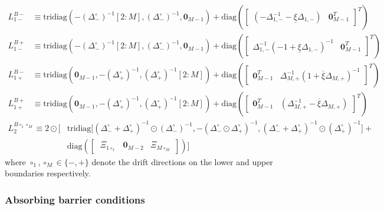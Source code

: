 \documentclass[11pt]{article}
\newcommand{\tridiag}{\ensuremath{\mathrm{tridiag}}}
\newcommand{\diag}{\ensuremath{\mathrm{diag}}}
\theoremstyle{definition}
\begin{document}
\begin{align}
{L}_{1-}^{B-} &\equiv
\tridiag \left(-(\Delta_-^\circ)^{-1}[2:M], (\Delta_-^\circ )^{-1}, \mathbf{0}_{M-1}  \right) +
\diag\left( 
\begin{bmatrix}
(-\Delta^{-1}_{1,-} - \underline{\xi} \Delta_{1,-}) &
\mathbf{0}_{M-1}^T
\end{bmatrix}^T
\right) \\
{L}_{1-}^{B+} &\equiv
\tridiag \left(-(\Delta_-^\circ)^{-1}[2:M], (\Delta_-^\circ )^{-1}, \mathbf{0}_{M-1}  \right) +
\diag\left( 
\begin{bmatrix}
\Delta^{-1}_{1,-} (-1 + \underline{\xi} \Delta_{1,-})^{-1} &
\mathbf{0}_{M-1}^T
\end{bmatrix}^T
\right)
\end{align}
\begin{align}
{L}_{1+}^{B-} &\equiv
\tridiag \left(\mathbf{0}_{M-1}, -(\Delta_+^\circ )^{-1}, (\Delta_+^\circ)^{-1}[2:M]  \right) +
\diag\left( 
\begin{bmatrix}
\mathbf{0}_{M-1}^T &
\Delta^{-1}_{M,+} (1 + \overline{\xi} \Delta_{M,+})^{-1}
\end{bmatrix}^T
\right) \\
{L}_{1+}^{B+} &\equiv
\tridiag \left(\mathbf{0}_{M-1}, -(\Delta_+^\circ )^{-1}, (\Delta_+^\circ)^{-1}[2:M]  \right) +
\diag\left( 
\begin{bmatrix}
\mathbf{0}_{M-1}^T &
(\Delta^{-1}_{M,+} - \overline{\xi} \Delta_{M,+})
\end{bmatrix}^T
\right) 
\end{align}
\begin{align}
{L}_{2}^{B \circ_1 \circ_M } \equiv
2 \odot \Big[ & \text{tridiag} \Big[(\Delta_-^\circ + \Delta_+^\circ)^{-1} \odot (\Delta_{-}^\circ)^{-1}, 
-(\Delta_-^\circ \odot \Delta_+^\circ)^{-1},
(\Delta_-^\circ + \Delta_+^\circ)^{-1} \odot (\Delta_{+}^\circ)^{-1} \Big] + \\ & \diag\left(  
\begin{bmatrix} \
\Xi_{1 \circ_1} & \mathbf{0}_{M-2} & \Xi_{M \circ_M}
\end{bmatrix}
\right) \Big]
\end{align}
where $\circ_1, \circ_M \in \{-, +\}$ denote the drift directions on the lower and upper boundaries respectively.


\subsubsection{Absorbing barrier conditions}
\end{document}
